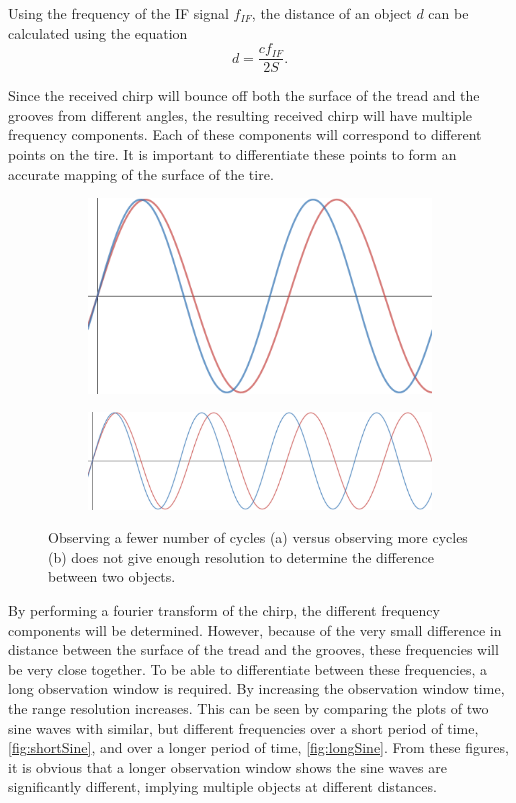\documentclass[11pt]{IEEEtran}
\begin{document}
		Using the frequency of the IF signal $f_{IF}$, the distance of an object $d$ can be calculated using the equation
		\begin{equation}
			d = \frac{cf_{IF}}{2S}.
		\end{equation}

		Since the received chirp will bounce off both the surface of the tread and the grooves from different angles, the resulting received chirp will have multiple frequency components. Each of these components will correspond to different points on the tire. It is important to differentiate these points to form an accurate mapping of the surface of the tire. 

			\begin{figure}[tbp]
				\centering
				\begin{subfigure}[b]{\linewidth}
					\includegraphics[width=0.5\linewidth,keepaspectratio]{shortSine.png}
					\caption{}
					\label{fig:shortSine}
				\end{subfigure} %
				\begin{subfigure}[b]{\linewidth}
					\includegraphics[width=\linewidth,keepaspectratio]{longSine.png}
					\caption{}
					\label{fig:longSine}
				\end{subfigure} %
				\caption{Observing a fewer number of cycles (a) versus observing more cycles (b) does not give enough resolution to determine the difference between two objects.}
				\label{fig:LongvShortSine}
			\end{figure}%

		By performing a fourier transform of the chirp, the different frequency components will be determined. However, because of the very small difference in distance between the surface of the tread and the grooves, these frequencies will be very close together. To be able to differentiate between these frequencies, a long observation window is required. By increasing the observation window time, the range resolution increases. This can be seen by comparing the plots of two sine waves with similar, but different frequencies over a short period of time, \autoref{fig:shortSine}, and over a longer period of time, \autoref{fig:longSine}. From these figures, it is obvious that a longer observation window shows the sine waves are significantly different, implying multiple objects at different distances.
\end{document}
